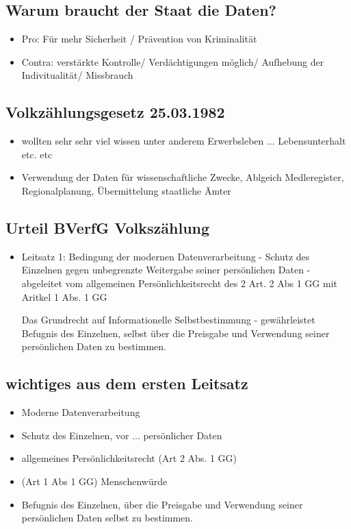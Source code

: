 \documentclass[a4paper,10pt]{scrartcl}
\begin{document}
\subsection{Warum braucht der Staat die Daten?}

\begin{itemize}
 \item Pro: Für mehr Sicherheit / Prävention von Kriminalität
 \item Contra: verstärkte Kontrolle/ Verdächtigungen möglich/ Aufhebung der Indivitualität/
 Missbrauch
\end{itemize}

\subsection{Volkzählungsgesetz 25.03.1982}

\begin{itemize}
 \item wollten sehr sehr viel wissen unter anderem Erwerbsleben ... Lebensunterhalt
 etc. etc
 \item Verwendung der Daten für wissenschaftliche Zwecke, Ablgeich Medleregister,
 Regionalplanung, Übermittelung staatliche Ämter
\end{itemize}

\subsection{Urteil BVerfG Volkszählung}
\begin{itemize}
 \item Leitsatz 1: Bedingung der modernen Datenverarbeitung - Schutz des 
 Einzelnen gegen unbegrenzte Weitergabe seiner persönlichen Daten -
 abgeleitet vom allgemeinen Persönlichkeitsrecht des 2 Art. 2 Abs 1 GG
 mit Aritkel 1 Abs. 1 GG
 
 Das Grundrecht auf Informationelle Selbstbestimmung - gewährleistet 
 Befugnis des Einzelnen, selbst über die Preisgabe und Verwendung
 seiner persönlichen Daten zu bestimmen.
\end{itemize}
\subsection{wichtiges aus dem ersten Leitsatz}
\begin{itemize}
 \item Moderne Datenverarbeitung
 \item Schutz des Einzelnen, vor ... persönlicher Daten
 \item allgemeines Persönlichkeitsrecht (Art 2 Abs. 1 GG)
 \item (Art 1 Abs 1 GG) Menschenwürde
 \item Befugnis des Einzelnen, über die Preisgabe und Verwendung
 seiner persönlichen Daten selbst zu bestimmen.
\end{itemize}
\end{document}

